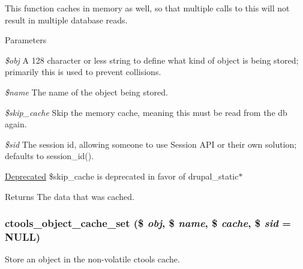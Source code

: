 This function caches in memory as well, so that multiple calls to this will not result in multiple database reads.


\begin{DoxyParams}{Parameters}
\item[{\em \$obj}]A 128 character or less string to define what kind of object is being stored; primarily this is used to prevent collisions. \item[{\em \$name}]The name of the object being stored. \item[{\em \$skip\_\-cache}]Skip the memory cache, meaning this must be read from the db again. \item[{\em \$sid}]The session id, allowing someone to use Session API or their own solution; defaults to session\_\-id().\end{DoxyParams}
\begin{Desc}
\item[\hyperlink{deprecated__deprecated000006}{Deprecated}]\$skip\_\-cache is deprecated in favor of drupal\_\-static$\ast$ \end{Desc}
\begin{DoxyReturn}{Returns}
The data that was cached. 
\end{DoxyReturn}
\hypertarget{object-cache_8inc_a996b3d25d26d4d3188cf7952d6988e65}{
\subsubsection[{ctools\_\-object\_\-cache\_\-set}]{\setlength{\rightskip}{0pt plus 5cm}ctools\_\-object\_\-cache\_\-set (\$ {\em obj}, \/  \$ {\em name}, \/  \$ {\em cache}, \/  \$ {\em sid} = {\ttfamily NULL})}}
\label{object-cache_8inc_a996b3d25d26d4d3188cf7952d6988e65}
Store an object in the non-\/volatile ctools cache.


